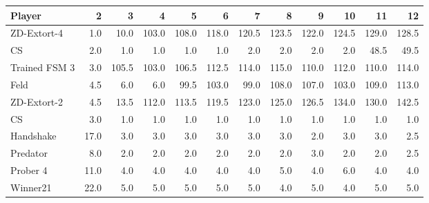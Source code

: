 \begin{tabular}{lrrrrrrrrrrr}
\toprule
        Player &     2 &      3 &      4 &      5 &      6 &      7 &      8 &      9 &     10 &     11 &     12 \\
\midrule
   ZD-Extort-4 &   1.0 &   10.0 &  103.0 &  108.0 &  118.0 &  120.5 &  123.5 &  122.0 &  124.5 &  129.0 &  128.5 \\
            CS &   2.0 &    1.0 &    1.0 &    1.0 &    1.0 &    2.0 &    2.0 &    2.0 &    2.0 &   48.5 &   49.5 \\
 Trained FSM 3 &   3.0 &  105.5 &  103.0 &  106.5 &  112.5 &  114.0 &  115.0 &  110.0 &  112.0 &  110.0 &  114.0 \\
          Feld &   4.5 &    6.0 &    6.0 &   99.5 &  103.0 &   99.0 &  108.0 &  107.0 &  103.0 &  109.0 &  113.0 \\
   ZD-Extort-2 &   4.5 &   13.5 &  112.0 &  113.5 &  119.5 &  123.0 &  125.0 &  126.5 &  134.0 &  130.0 &  142.5 \\
            CS &   3.0 &    1.0 &    1.0 &    1.0 &    1.0 &    1.0 &    1.0 &    1.0 &    1.0 &    1.0 &    1.0 \\
     Handshake &  17.0 &    3.0 &    3.0 &    3.0 &    3.0 &    3.0 &    3.0 &    2.0 &    3.0 &    3.0 &    2.5 \\
      Predator &   8.0 &    2.0 &    2.0 &    2.0 &    2.0 &    2.0 &    2.0 &    3.0 &    2.0 &    2.0 &    2.5 \\
      Prober 4 &  11.0 &    4.0 &    4.0 &    4.0 &    4.0 &    4.0 &    5.0 &    4.0 &    6.0 &    4.0 &    4.0 \\
      Winner21 &  22.0 &    5.0 &    5.0 &    5.0 &    5.0 &    5.0 &    4.0 &    5.0 &    4.0 &    5.0 &    5.0 \\
\bottomrule
\end{tabular}
